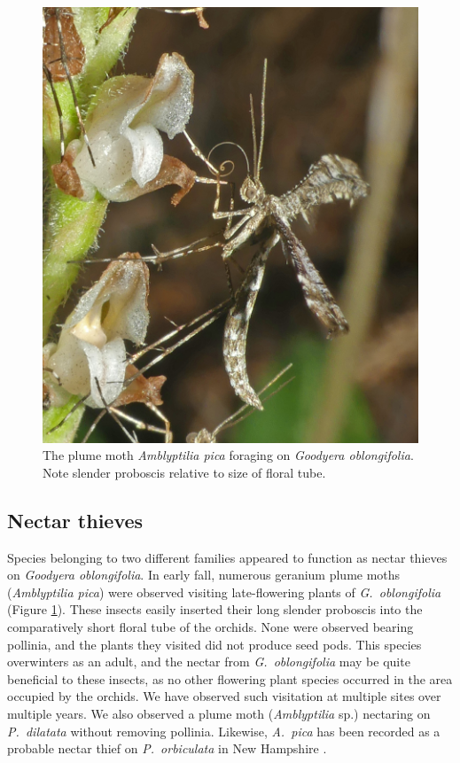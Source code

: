 \begin{multicols}{2}
\begin{figure}[H]
\begin{center}
\vspace{2mm}
\includegraphics[width=\textwidth]{img/Goodyera_oblongifolia_Amblyptilia_pica.jpg}
\caption{The plume moth \emph{Amblyptilia pica} foraging on \emph{Goodyera oblongifolia}. Note slender proboscis relative to size of floral tube.}
\label{Goodyera_oblongifolia_Amblyptilia_pica}
\end{center}
\end{figure}




\subsection{Nectar thieves}

Species belonging to two different families appeared to function as
nectar thieves on \emph{Goodyera oblongifolia}. In early fall, numerous
geranium plume moths (\emph{Amblyptilia pica}) were observed visiting
late-flowering plants of \emph{G.\ oblongifolia} (Figure \ref{Goodyera_oblongifolia_Amblyptilia_pica}). These
insects easily inserted their long slender proboscis into the
comparatively short floral tube of the orchids. None were observed
bearing pollinia, and the plants they visited did not produce seed pods.
This species overwinters as an adult, and the nectar from \emph{G.\
oblongifolia} may be quite beneficial to these insects, as no other
flowering plant species occurred in the area occupied by the orchids. We
have observed such visitation at multiple sites over multiple years. We
also observed a plume moth (\emph{Amblyptilia} sp.) nectaring on \emph{P.\
dilatata} without removing pollinia. Likewise, \emph{A.\ pica} has been
recorded as a probable nectar thief on \emph{P.\ orbiculata} in New
Hampshire \citep{Bergumetal2018}.



\end{multicols}
